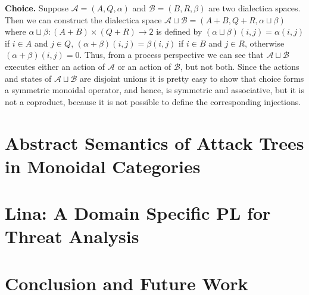 \documentclass{llncs}
\newcommand{\cat}[1]{\mathcal{#1}}
\newenvironment{changemargin}[2]{%
  \begin{list}{}{%
    \setlength{\topsep}{0pt}%
    \setlength{\leftmargin}{#1}%
    \setlength{\rightmargin}{#2}%
    \setlength{\listparindent}{\parindent}%
    \setlength{\itemindent}{\parindent}%
    \setlength{\parsep}{\parskip}%
  }%
  \item[]}{\end{list}}
\begin{document}
\begin{changemargin}{5pt}{5pt}\noindent
\textbf{Choice.} Suppose $\cat{A} = (A , Q, \alpha)$ and $\cat{B} = (B
, R , \beta)$ are two dialectica spaces.  Then we can construct the
dialectica space $\cat{A} \sqcup \cat{B} = (A + B, Q + R, \alpha
\sqcup \beta)$ where $\alpha \sqcup \beta : (A + B) \times (Q + R) \to
\mathsf{2}$ is defined by $(\alpha \sqcup \beta)(i , j) = \alpha(i ,
j)$ if $i \in A$ and $j \in Q$, $(\alpha + \beta)(i , j) = \beta(i ,
j)$ if $i \in B$ and $j \in R$, otherwise $(\alpha + \beta)(i , j) =
0$.  Thus, from a process perspective we can see that $\cat{A} \sqcup
\cat{B}$ executes either an action of $\cat{A}$ or an action of
$\cat{B}$, but not both.  Since the actions and states of $\cat{A}
\sqcup \cat{B}$ are disjoint unions it is pretty easy to show that
choice forms a symmetric monoidal operator, and hence, is symmetric
and associative, but it is not a coproduct, because it is not possible
to define the corresponding injections.
\end{changemargin}




\section{Abstract Semantics of Attack Trees in Monoidal Categories}
\label{sec:abstract_semantics_of_attack_trees_in_monoidal_categories}


\section{Lina: A Domain Specific PL for Threat Analysis}
\label{sec:lina:_a_domain_specific_pl_for_threat_analysis}


\section{Conclusion and Future Work}
\label{sec:conclusion_and_future_work}



 

\appendix
\end{document}
